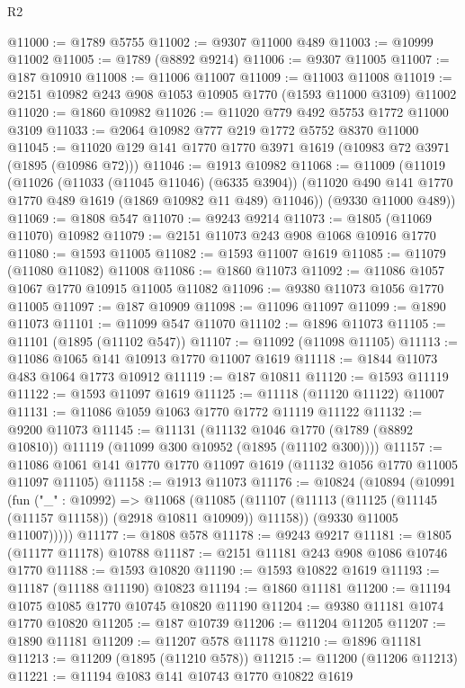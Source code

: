\begin{lexlean}{R2}
\begin{coremodule}
@11000 := @1789 @5755
@11002 := @9307 @11000 @489
@11003 := @10999 @11002
@11005 := @1789 (@8892 @9214)
@11006 := @9307 @11005
@11007 := @187 @10910
@11008 := @11006 @11007
@11009 := @11003 @11008
@11019 := @2151 @10982 @243 @908 @1053 @10905 @1770 (@1593 @11000 @3109) @11002
@11020 := @1860 @10982
@11026 := @11020 @779 @492 @5753 @1772 @11000 @3109
@11033 := @2064 @10982 @777 @219 @1772 @5752 @8370 @11000
@11045 := @11020 @129 @141 @1770 @1770 @3971 @1619 (@10983 @72 @3971 (@1895 (@10986 @72)))
@11046 := @1913 @10982
@11068 := @11009
    (@11019
      (@11026
        (@11033 (@11045 @11046) (@6335 @3904))
        (@11020 @490 @141 @1770 @1770 @489 @1619 (@1869 @10982 @11 @489) @11046))
      (@9330 @11000 @489))
@11069 := @1808 @547
@11070 := @9243 @9214
@11073 := @1805 (@11069 @11070) @10982
@11079 := @2151 @11073 @243 @908 @1068 @10916 @1770
@11080 := @1593 @11005
@11082 := @1593 @11007 @1619
@11085 := @11079 (@11080 @11082) @11008
@11086 := @1860 @11073
@11092 := @11086 @1057 @1067 @1770 @10915 @11005 @11082
@11096 := @9380 @11073 @1056 @1770 @11005
@11097 := @187 @10909
@11098 := @11096 @11097
@11099 := @1890 @11073
@11101 := @11099 @547 @11070
@11102 := @1896 @11073
@11105 := @11101 (@1895 (@11102 @547))
@11107 := @11092 (@11098 @11105)
@11113 := @11086 @1065 @141 @10913 @1770 @11007 @1619
@11118 := @1844 @11073 @483 @1064 @1773 @10912
@11119 := @187 @10811
@11120 := @1593 @11119
@11122 := @1593 @11097 @1619
@11125 := @11118 (@11120 @11122) @11007
@11131 := @11086 @1059 @1063 @1770 @1772 @11119 @11122
@11132 := @9200 @11073
@11145 := @11131
    (@11132 @1046 @1770 (@1789 (@8892 @10810)) @11119 (@11099 @300 @10952 (@1895 (@11102 @300))))
@11157 := @11086 @1061 @141 @1770 @1770 @11097 @1619 (@11132 @1056 @1770 @11005 @11097 @11105)
@11158 := @1913 @11073
@11176 := @10824
    (@10894
      (@10991
        (fun ("_" : @10992) =>
        @11068
          (@11085
            (@11107 (@11113 (@11125 (@11145 (@11157 @11158)) (@2918 @10811 @10909)) @11158))
            (@9330 @11005 @11007)))))
@11177 := @1808 @578
@11178 := @9243 @9217
@11181 := @1805 (@11177 @11178) @10788
@11187 := @2151 @11181 @243 @908 @1086 @10746 @1770
@11188 := @1593 @10820
@11190 := @1593 @10822 @1619
@11193 := @11187 (@11188 @11190) @10823
@11194 := @1860 @11181
@11200 := @11194 @1075 @1085 @1770 @10745 @10820 @11190
@11204 := @9380 @11181 @1074 @1770 @10820
@11205 := @187 @10739
@11206 := @11204 @11205
@11207 := @1890 @11181
@11209 := @11207 @578 @11178
@11210 := @1896 @11181
@11213 := @11209 (@1895 (@11210 @578))
@11215 := @11200 (@11206 @11213)
@11221 := @11194 @1083 @141 @10743 @1770 @10822 @1619

\end{coremodule}
\end{lexlean}
